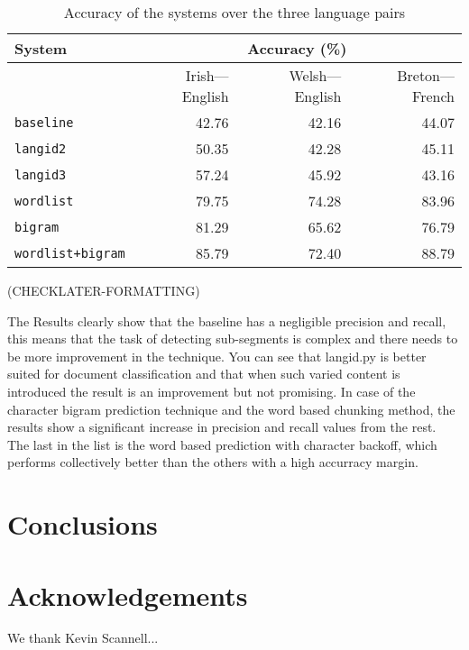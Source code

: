\documentclass[11pt]{article}
\begin{document}
\begin{table}
\begin{center}
\begin{tabular}{|l|r|r|r|}
\hline
\textbf{System} &  \multicolumn{3}{c|}{\textbf{Accuracy} (\%)} \\
\hline
       &   Irish---English & Welsh---English & Breton---French \\ 
\hline
\texttt{baseline} & 42.76 & 42.16 & 44.07 \\
\hline
\texttt{langid2} & 50.35 & 42.28 & 45.11  \\
\hline
\texttt{langid3} & 57.24 & 45.92 & 43.16 \\
\hline
\texttt{wordlist} & 79.75 & 74.28 & 83.96 \\
\hline
\texttt{bigram} & 81.29 & 65.62 & 76.79 \\
\hline
\texttt{wordlist+bigram} & 85.79 & 72.40 & 88.79 \\
\hline
\end{tabular}
\end{center}
\label{table:accuracy}
\caption{Accuracy of the systems over the three language pairs}
\end{table}


(CHECKLATER-FORMATTING)

The Results clearly show that the baseline has a negligible precision and recall, this means that the task of detecting sub-segments is complex and there needs to be more improvement in the technique. You can see that langid.py is better suited for document classification and that when such varied content is introduced the result is an improvement but not promising. In case of the character bigram prediction technique and the word based chunking method, the results show a significant increase in precision and recall values from the rest. The last in the list is the word based prediction with character backoff, which performs collectively better than the others with a high accurracy margin. \\


\section{Conclusions}


\section*{Acknowledgements}

We thank Kevin Scannell... 



\end{document}

